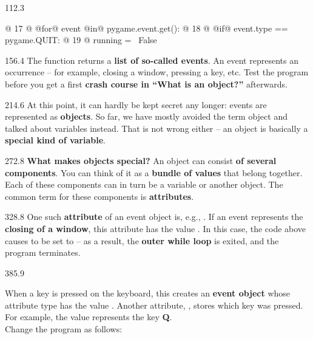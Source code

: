 \documentclass{aslab}
\newcommand*\codexi[1]{\fontsize{11bp}{#1bp}\ttfamily\lineskiplimit=-\maxdimen}
\begin{document}
\begin{region}[x=78.7,right=0]{112.3}
\begin{codeblock}[style=py,basicstyle=\codexi{12}]
@ 17 @    @for@ event @in@ pygame.event.get():
@ 18 @        @if@ event.type == pygame.QUIT:
@ 19 @            running = ~False~
\end{codeblock}
\end{region}

\begin{region}[x=74.7,right=0,pitch=13.93]{156.4}
The function  returns a \textbf{list of so-called
events}. An event represents an occurrence -- for example, closing a
window, pressing a key, etc. Test the program before you get a first
\textbf{crash course in ``What is an object?''} afterwards.
\end{region}

\begin{region}[x=74.7,right=0,pitch=13.9]{214.6}
At this point, it can hardly be kept secret any longer: events are
represented as \textbf{objects}. So far, we have mostly avoided the term
object and talked about variables instead. That is not wrong either -- an
object is basically a \textbf{special kind of variable}.
\end{region}

\begin{region}[x=74.7,right=0,pitch=13.9]{272.8}
\textbf{What makes objects special?} An object can consist \textbf{of several
components}. You can think of it as a \textbf{bundle of values} that belong
together. Each of these components can in turn be a variable or another
object. The common term for these components is \textbf{attributes}.
\end{region}

\begin{region}[x=74.7,right=0,pitch=14.27]{328.8}
One such \textbf{attribute} of an event object is, e.g., . If an
event represents the \textbf{closing of a window}, this attribute has the
value . In this case, the code above causes
 to be set to  -- as a result, the \textbf{outer
while loop} is exited, and the program terminates.
\end{region}

\begin{region}[pitch=13.7]{385.9}
\begin{tasks}[start=3]
\item When a key is pressed on the keyboard, this creates an
  \textbf{event object} whose attribute type has the value
  . Another attribute, , stores which key was
  pressed. For example, the value  represents the key
  \textbf{Q}.\\
  Change the program as follows:
\end{tasks}
\end{region}
\end{document}
